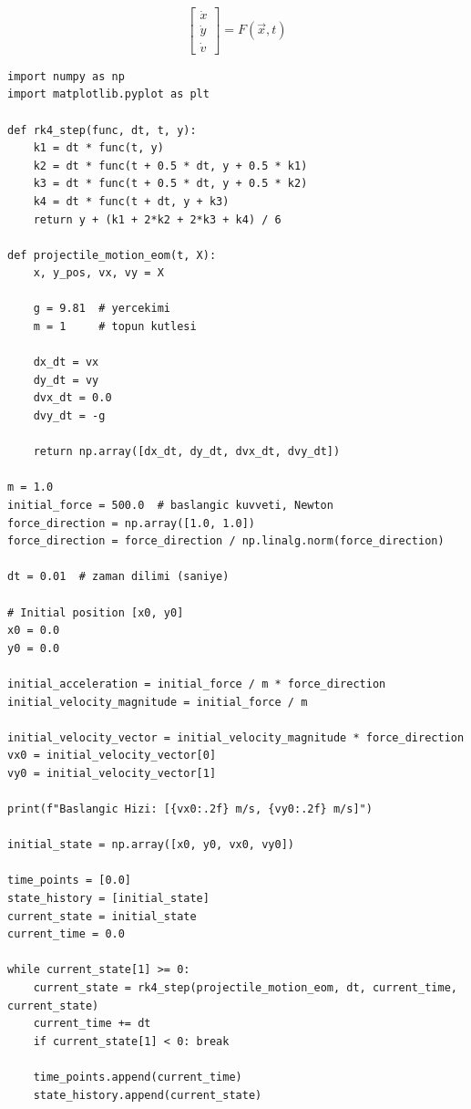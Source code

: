\documentclass[12pt,fleqn]{article}\usepackage{../../common}
\begin{document}
$$
\left[\begin{array}{c}
\dot{x} \\ \dot{y} \\ \dot{v}
\end{array}\right] = F(\vec{x},t)
$$

\begin{verbatim}
import numpy as np
import matplotlib.pyplot as plt

def rk4_step(func, dt, t, y):
    k1 = dt * func(t, y)
    k2 = dt * func(t + 0.5 * dt, y + 0.5 * k1)
    k3 = dt * func(t + 0.5 * dt, y + 0.5 * k2)
    k4 = dt * func(t + dt, y + k3)
    return y + (k1 + 2*k2 + 2*k3 + k4) / 6

def projectile_motion_eom(t, X):
    x, y_pos, vx, vy = X

    g = 9.81  # yercekimi
    m = 1     # topun kutlesi

    dx_dt = vx
    dy_dt = vy
    dvx_dt = 0.0 
    dvy_dt = -g  

    return np.array([dx_dt, dy_dt, dvx_dt, dvy_dt])

m = 1.0
initial_force = 500.0  # baslangic kuvveti, Newton 
force_direction = np.array([1.0, 1.0])
force_direction = force_direction / np.linalg.norm(force_direction) 

dt = 0.01  # zaman dilimi (saniye)

# Initial position [x0, y0]
x0 = 0.0
y0 = 0.0

initial_acceleration = initial_force / m * force_direction
initial_velocity_magnitude = initial_force / m 
                                                                                                                                             
initial_velocity_vector = initial_velocity_magnitude * force_direction
vx0 = initial_velocity_vector[0]
vy0 = initial_velocity_vector[1]

print(f"Baslangic Hizi: [{vx0:.2f} m/s, {vy0:.2f} m/s]")

initial_state = np.array([x0, y0, vx0, vy0])

time_points = [0.0]
state_history = [initial_state]
current_state = initial_state
current_time = 0.0

while current_state[1] >= 0:
    current_state = rk4_step(projectile_motion_eom, dt, current_time, current_state)
    current_time += dt
    if current_state[1] < 0: break

    time_points.append(current_time)
    state_history.append(current_state)


\end{verbatim}
\end{document}
